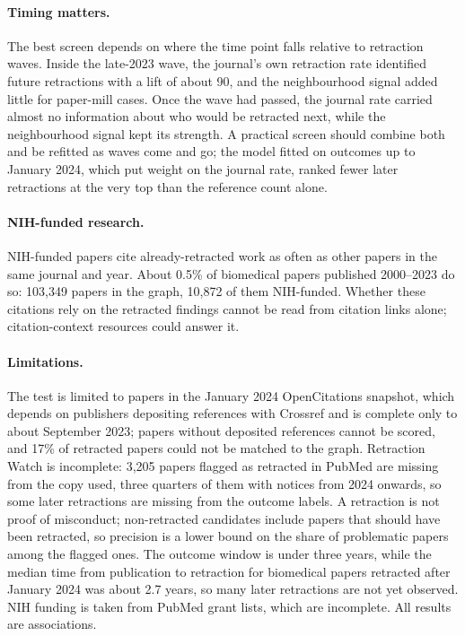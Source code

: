 \documentclass[pdflatex,sn-basic]{sn-jnl}
\begin{document}
\paragraph{Timing matters.} The best screen depends on where the time point falls relative to retraction waves. Inside
the late-2023 wave, the journal's own retraction rate identified future retractions with a lift of about 90, and the
neighbourhood signal added little for paper-mill cases. Once the wave had passed, the journal rate carried almost no
information about who would be retracted next, while the neighbourhood signal kept its strength. A practical screen
should combine both and be refitted as waves come and go; the model fitted on outcomes up to January 2024, which put weight on the journal
rate, ranked fewer later retractions at the very top than the reference count alone.

\paragraph{NIH-funded research.} NIH-funded papers cite already-retracted work as often as other papers in the same
journal and year. About 0.5\% of biomedical papers published 2000--2023 do so: 103,349 papers in the graph, 10,872 of them
NIH-funded. Whether these citations rely on the retracted findings cannot be read from
citation links alone; citation-context resources \citep{joseph2026sanecite,hsiao2021continued} could answer it.

\paragraph{Limitations.} The test is limited to papers in the January 2024 OpenCitations snapshot, which depends on
publishers depositing references with Crossref and is complete only to about September 2023; papers without deposited
references cannot be scored, and 17\% of retracted papers could not be matched to the graph. Retraction Watch is
incomplete: 3,205 papers flagged as retracted in PubMed are missing from the copy used, three quarters of them with
notices from 2024 onwards, so some later retractions are missing from the outcome labels. A retraction is not proof of
misconduct; non-retracted candidates include papers that should have been
retracted, so precision is a lower bound on the share of problematic papers among the flagged ones. The outcome window
is under three years, while the median time from publication to retraction for biomedical papers retracted after January
2024 was about 2.7 years, so
many later retractions are not yet observed. NIH funding is taken from PubMed grant lists, which are incomplete. All
results are associations.
\end{document}
